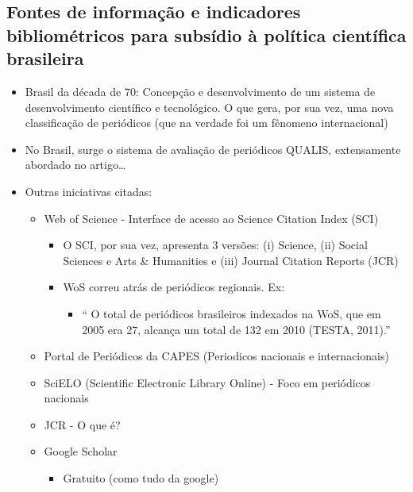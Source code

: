 \documentclass[11pt]{article}
\begin{document}
\subsection{Fontes de informação e indicadores bibliométricos para subsídio à política científica brasileira}
\label{sec:orge6cd250}

\begin{itemize}
\item Brasil da década de 70: Concepção e desenvolvimento de um sistema de desenvolvimento científico e tecnológico. O que gera, por sua vez, uma nova classificação de periódicos (que na verdade foi um fênomeno internacional)

\item No Brasil, surge o sistema de avaliação de periódicos QUALIS, extensamente abordado no artigo\ldots{}

\item Outras iniciativas citadas:

\begin{itemize}
\item Web of Science - Interface de acesso ao Science Citation Index (SCI)

\begin{itemize}
\item O SCI, por sua vez, apresenta 3 versões: (i) Science, (ii) Social Sciences e Arts \& Humanities e (iii) Journal Citation Reports (JCR)

\item WoS correu atrás de periódicos regionais. Ex:

\begin{itemize}
\item `` O total de periódicos brasileiros indexados na WoS, que em 2005 era 27, alcança um total de 132 em 2010 (TESTA, 2011).''
\end{itemize}
\end{itemize}

\item Portal de Periódicos da CAPES (Periodicos nacionais e internacionais)

\item SciELO (Scientific Electronic Library Online) - Foco em periódicos nacionais

\item JCR - O que é?

\item Google Scholar

\begin{itemize}
\item Gratuito (como tudo da google)


\end{itemize}
\end{itemize}
\end{itemize}
\end{document}
